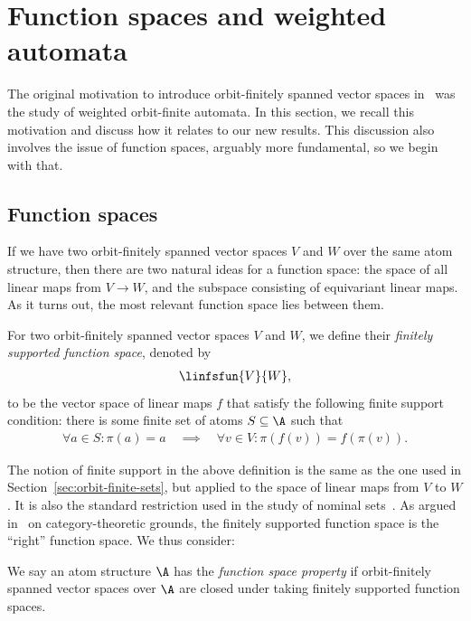 \section{Function spaces and  weighted automata}\label{sec:duals}

The original motivation to introduce orbit-finitely spanned vector spaces in~\cite{BFKM24} was the study of weighted orbit-finite automata. 
In this section, we recall this motivation and discuss how it relates to our new results. 
This discussion also involves the issue of function spaces, arguably more fundamental, so we begin with that.
 
\subsection{Function spaces} 
If we have two orbit-finitely spanned vector spaces $V$ and $W$ over the same atom structure, then there are two natural ideas for a function space: 
the space of all linear maps from $V \to W$, and the subspace consisting of equivariant linear maps. 
As it turns out, the most relevant function space lies between them.


\begin{definition}\label{def:function-space}
    For two orbit-finitely spanned vector spaces $V$ and $W$, we define their \emph{finitely supported function space}, denoted by 
    \begin{align*}
     \linfsfun{V}{W},
    \end{align*}
    to be the vector space of linear maps $f$ that satisfy the following {finite support condition}: 
    there is some finite set of atoms $S \subseteq \A$ such that
    \begin{align*}
        \forall a \in S : \pi(a)=a
        \quad \implies \quad 
        \forall v \in V : \pi(f(v)) = f(\pi(v)).
    \end{align*}
\end{definition}

The notion of finite support in the above definition is the same as the one used in Section~\ref{sec:orbit-finite-sets}, 
but applied to the space of linear maps from $V$ to $W$. 
It is also the standard restriction used in the study of nominal sets~\cite[Thm.~2.19]{PittsAM:nomsns}.
As argued in~\cite[Sec.~8.3]{bojanczyk_slightly} on category-theoretic grounds, 
the finitely supported function space is the ``right'' function space.
We thus consider:

\begin{definition}\label{def:function-space-property}
    We say an atom structure $\A$ has the \emph{function space property} 
    if orbit-finitely spanned vector spaces over $\A$ are closed under taking finitely supported function spaces.
\end{definition}

